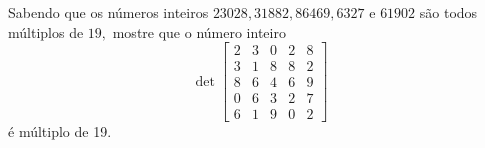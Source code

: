 \documentclass[11pt,a4paper]{article}
\begin{document}
 Sabendo que os números inteiros $23028, 31882, 86469, 6327$ e $61902$ são todos múltiplos de $19,$ mostre que o número inteiro \[\det  \left[ \begin{array}{ccccc} 2 & 3 &0  & 2 & 8\\ 3 & 1 & 8 & 8 & 2 \\ 8 & 6 & 4 & 6 & 9 \\ 0 & 6 & 3 & 2 & 7 \\ 6 & 1 & 9 & 0 & 2 \end{array} \right]\] é múltiplo de 19.
\end{document}
